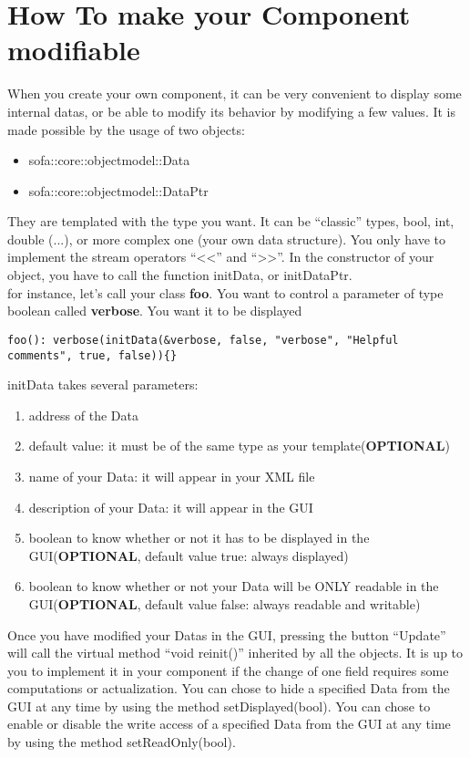 
\section{How To make your Component modifiable}
When you create your own component, it can be very convenient to display some internal datas, or be able to modify its behavior by modifying a few values. It is made possible by the usage of two objects:
\begin{itemize}
 \item sofa::core::objectmodel::Data
 \item sofa::core::objectmodel::DataPtr
\end{itemize}
They are templated with the type you want. It can be ``classic'' types, bool, int, double (...), or more complex one (your own data structure). You only have to implement the stream operators ``<<'' and ``>>''. In the constructor of your object, you have to call the function initData, or initDataPtr. 
\\
for instance, let's call your class  {\bf foo}. You want to control a parameter of type boolean called {\bf verbose}. You want it to be displayed
\begin{verbatim}
foo(): verbose(initData(&verbose, false, "verbose", "Helpful comments", true, false)){}
\end{verbatim}

initData takes several parameters: 
\begin{enumerate}
 \item address of the Data
 \item default value: it must be of the same type as your template({\bf OPTIONAL})
 \item name of your Data: it will appear in your XML file
 \item description of your Data: it will appear in the GUI
 \item boolean to know whether or not it has to be displayed in the GUI({\bf OPTIONAL}, default value true: always displayed)
 \item boolean to know whether or not your Data will be ONLY readable in the GUI({\bf OPTIONAL}, default value false: always readable and writable)
\end{enumerate}

 Once you have modified your Datas in the GUI, pressing the button ``Update'' will call the virtual method ``void reinit()'' inherited by all the objects. It is up to you to implement it in your component if the change of one field requires some computations or actualization.
You can chose to hide a specified Data from the GUI at any time by using the method setDisplayed(bool).
You can chose to enable or disable the write access of a specified Data from the GUI at any time by using the method setReadOnly(bool).
